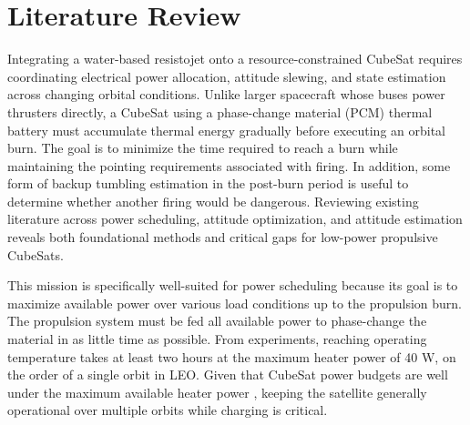 

\section{Literature Review}

Integrating a water-based resistojet onto a resource-constrained CubeSat requires coordinating electrical power allocation, attitude slewing, and state estimation across changing orbital conditions. Unlike larger spacecraft whose buses power thrusters directly, a CubeSat using a phase-change material (PCM) thermal battery must accumulate thermal energy gradually before executing an orbital burn. The goal is to minimize the time required to reach a burn while maintaining the pointing requirements associated with firing. In addition, some form of backup tumbling estimation in the post-burn period is useful to determine whether another firing would be dangerous. Reviewing existing literature across power scheduling, attitude optimization, and attitude estimation reveals both foundational methods and critical gaps for low-power propulsive CubeSats.

This mission is specifically well-suited for power scheduling because its goal is to maximize available power over various load conditions up to the propulsion burn. The propulsion system must be fed all available power to phase-change the material in as little time as possible. From experiments, reaching operating temperature takes at least two hours at the maximum heater power of 40 W, on the order of a single orbit in LEO. Given that CubeSat power budgets are well under the maximum available heater power \cite{clarkHugePowerDemandItsyBitsy2010}, keeping the satellite generally operational over multiple orbits while charging is critical.

